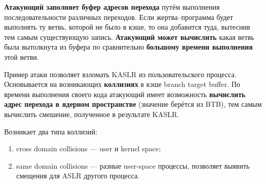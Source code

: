 \begin{frame}{\insertsubsection}
{    \textbf{Атакующий заполняет буфер адресов перехода} путём выполнения
    последовательности различных переходов. Если жертва--программа будет
    выполнять ту ветвь, которой не было в кэше, то она добавится туда, вытеснив
    тем самым существующую запись. \textbf{Атакующий может вычислить} какая
    ветвь была вытолкнута из буфера по сравнительно \textbf{большому времени
      выполнения} этой ветви.

    Пример атаки позволяет взломать KASLR из пользовательского процесса.
    Основывается на возникающих \textbf{коллизиях} в кэше branch target buffer.
    По времени выполнения своего кода атакующий имеет возможность
    \textbf{вычислить адрес перехода в ядерном пространстве} (значение берётся
    из BTB), тем самым вычислить смешение, полученное в результате KASLR.

    Возникает два типа коллизий:

    \begin{enumerate}
    \item cross domain collisions --- user и kernel space;
    \item same domain collisions --- разные user-space процессы, позволяет
      выявить смещения для ASLR другого процесса.
    \end{enumerate}

  }

\end{frame}

